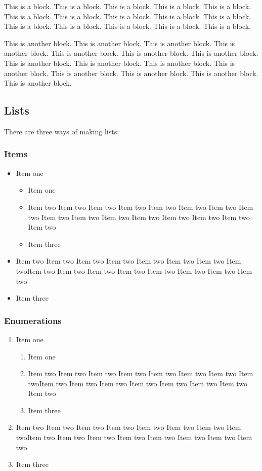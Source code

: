 This is a block. This is a block. This is a block. This is a block.
This is a block. This is a block. This is a block. This is a block.
This is a block. This is a block. This is a block. This is a block.
This is a block. This is a block. This is a block.

This is another block. This is another block. This is another block.
This is another block. This is another block. This is another block.
This is another block. This is another block. This is another block.
This is another block. This is another block. This is another block.
This is another block. This is another block. This is another block.

\subsection{Lists}

There are three ways of making lists:

\subsubsection{Items}

\begin{itemize}
  \item Item one
  \begin{itemize}
    \item Item one
    \item Item two Item two Item two Item two Item two Item two Item
    two Item two
    Item two Item two Item two Item two Item two Item two Item
    two Item two
    \item Item three
  \end{itemize}
  \item Item two Item two Item two Item two Item two Item two Item two
Item twoItem two Item two Item two Item two Item two Item two Item two
Item two
  \item Item three
\end{itemize}

\subsubsection{Enumerations}

\begin{enumerate}
  \item Item one
  \begin{enumerate}
    \item Item one
    \item Item two Item two Item two Item two Item two Item two Item
two Item twoItem two Item two Item two Item two Item two Item two Item
two Item two
    \item Item three
  \end{enumerate}
  \item Item two Item two Item two Item two Item two Item two Item two
Item twoItem two Item two Item two Item two Item two Item two Item two
Item two
  \item Item three
\end{enumerate}

